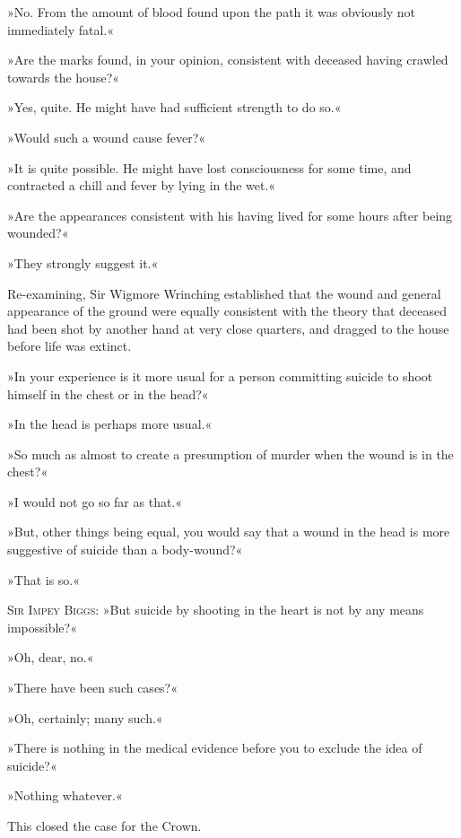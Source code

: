 »No. From the amount of blood found upon the path it was obviously not immediately fatal.«

»Are the marks found, in your opinion, consistent with deceased having crawled towards the house?«

»Yes, quite. He might have had sufficient strength to do so.«

»Would such a wound cause fever?«

»It is quite possible. He might have lost consciousness for some time, and contracted a chill and fever by lying in the wet.«

»Are the appearances consistent with his having lived for some hours after being wounded?«

»They strongly suggest it.«

Re-examining, Sir Wigmore Wrinching established that the wound and general appearance of the ground were equally consistent with the theory that deceased had been shot by another hand at very close quarters, and dragged to the house before life was extinct.

»In your experience is it more usual for a person committing suicide to shoot himself in the chest or in the head?«

»In the head is perhaps more usual.«

»So much as almost to create a presumption of murder when the wound is in the chest?«

»I would not go so far as that.«

»But, other things being equal, you would say that a wound in the head is more suggestive of suicide than a body-wound?«

»That is so.«

\textsc{Sir Impey Biggs}: »But suicide by shooting in the heart is not by any means impossible?«

»Oh, dear, no.«

»There have been such cases?«

»Oh, certainly; many such.«

»There is nothing in the medical evidence before you to exclude the idea of suicide?«

»Nothing whatever.«

This closed the case for the Crown. 
